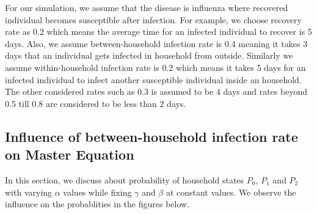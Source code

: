 \documentclass[paper=a4, fontsize=11pt, twoside, BCOR=12mm, parskip=full, listof=totoc]{scrreprt}
\begin{document}
{For our simulation, we assume that the disease is influenza where recovered individual becomes susceptible after infection. For example, we choose recovery rate as 0.2 which means the average time for an infected individual to recover is 5 days. Also, we assume between-household infection rate is 0.4 meaning it takes 3 days that an individual gets infected in household from outside. Similarly we assume within-household infection rate is 0.2 which means it takes 5 days for an infected individual to infect another susceptible individual inside an household. The other considered rates such as 0.3 is assumed to be 4 days and rates beyond 0.5 till 0.8 are considered to be less than 2 days.\\ 
%
\subsection*{Influence of between-household infection rate on Master Equation}
\label{observation alpha parameter}

In this section, we discuss about probability of household states $P_0$, $P_1$ and $P_2$ with varying $\alpha$ values while fixing $\gamma$ and $\beta$ at constant values. We observe the influence on the probablities in the figures below.  

}
\end{document}
